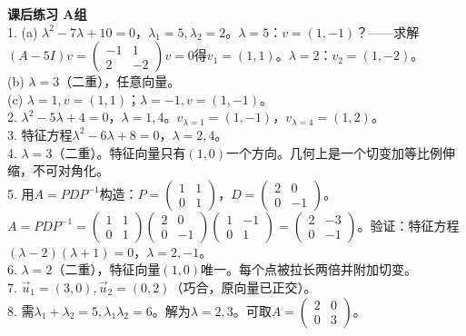 \noindent\textbf{课后练习 A组}\\
1. (a) $\lambda^2-7\lambda+10=0$，$\lambda_1=5,\lambda_2=2$。$\lambda=5$：$v=(1,-1)$？——求解$(A-5I)v=\begin{pmatrix}-1&1\\2&-2\end{pmatrix}v=0$得$v_1=(1,1)$。$\lambda=2$：$v_2=(1,-2)$。\\
(b) $\lambda=3$（二重），任意向量。\\
(c) $\lambda=1,v=(1,1)$；$\lambda=-1,v=(1,-1)$。\\
2. $\lambda^2-5\lambda+4=0$，$\lambda=1,4$。$v_{\lambda=1}=(1,-1)$，$v_{\lambda=4}=(1,2)$。\\
3. 特征方程$\lambda^2-6\lambda+8=0$，$\lambda=2,4$。\\
4. $\lambda=3$（二重）。特征向量只有$(1,0)$一个方向。几何上是一个切变加等比例伸缩，不可对角化。\\
5. 用$A=PDP^{-1}$构造：$P=\begin{pmatrix}1&1\\0&1\end{pmatrix}$，$D=\begin{pmatrix}2&0\\0&-1\end{pmatrix}$。$A=PDP^{-1}=\begin{pmatrix}1&1\\0&1\end{pmatrix}\begin{pmatrix}2&0\\0&-1\end{pmatrix}\begin{pmatrix}1&-1\\0&1\end{pmatrix}=\begin{pmatrix}2&-3\\0&-1\end{pmatrix}$。验证：特征方程$(\lambda-2)(\lambda+1)=0$，$\lambda=2,-1$。\\
6. $\lambda=2$（二重），特征向量$(1,0)$唯一。每个点被拉长两倍并附加切变。\\
7. $\vec u_1=(3,0),\vec u_2=(0,2)$（巧合，原向量已正交）。\\
8. 需$\lambda_1+\lambda_2=5,\lambda_1\lambda_2=6$。解为$\lambda=2,3$。可取$A=\begin{pmatrix}2&0\\0&3\end{pmatrix}$。\\

